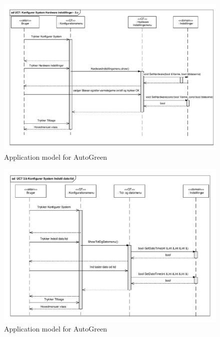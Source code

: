\clearpage

\begin{figure}[!h]
\centering 
\includegraphics[width={\textwidth-1cm}, trim=0 0 0 0, clip=true] {../fig/SD_autoGreen_UC_7_Hardware_indstillinger.pdf}
\caption{Application model for AutoGreen}
\label{fig:SD_UC7_alt1}
\end{figure}

\clearpage

\begin{figure}[!h]
\centering 
\includegraphics[width={\textwidth-1cm}, trim=0 0 0 0, clip=true] {../fig/SD_autoGreen_UC_7_Indstil_dato_tid.pdf}
\caption{Application model for AutoGreen}
\label{fig:SD_UC7_alt2}
\end{figure}

\clearpage

